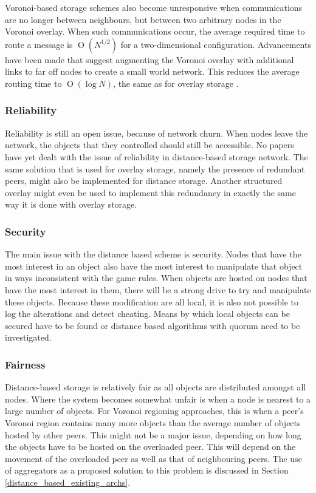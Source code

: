 \documentclass[10pt,a4paper,journal,cspaper,compsoc]{IEEEtran}
\providecommand{\OO}[1]{\operatorname{O}\left(#1\right)}
\begin{document}
Voronoi-based storage schemes also become unresponsive when communications are no longer between neighbours, but between two arbitrary nodes in the
Voronoi overlay. When such communications occur, the average required time to route a message is $\OO{N^{1/2}}$ for a two-dimensional configuration.
Advancements have been made that suggest augmenting the Voronoi overlay with additional links to far off nodes to create a small world network. This
reduces the average routing time to $\OO{\log{N}}$, the same as for overlay storage \cite{Steiner_voronoi_shortcuts}.

\subsubsection{Reliability}

Reliability is still an open issue, because of network churn. When nodes leave the network, the objects that they controlled should still be
accessible. No papers have yet dealt with the issue of reliability in distance-based storage network. The same solution that is used for overlay
storage, namely the presence of redundant peers, might also be implemented for distance storage. Another structured overlay might even be used to
implement this redundancy in exactly the same way it is done with overlay storage.

\subsubsection{Security}
\label{distance_based_storage_security}

The main issue with the distance based scheme is security. Nodes that have the most interest in an object also have the most interest to manipulate
that object in ways inconsistent with the game rules. When objects are hosted on nodes that have the most interest in them, there will be a strong
drive to try and manipulate these objects. Because these modification are all local, it is also not possible to log the alterations and detect
cheating. Means by which local objects can be secured have to be found or distance based algorithms with quorum need to be investigated.

\subsubsection{Fairness}

Distance-based storage is relatively fair as all objects are distributed amongst all nodes. Where the system becomes somewhat unfair is when a node
is nearest to a large number of objects. For Voronoi regioning approaches, this is when a peer's Voronoi region contains many more objects than the
average number of objects hosted by other peers. This might not be a major issue, depending on how long the objects have to be hosted on the
overloaded peer. This will depend on the movement of the overloaded peer as well as that of neighbouring peers. The use of aggregators as a proposed
solution to this problem is discussed in Section \ref{distance_based_existing_archs}.
\end{document}
